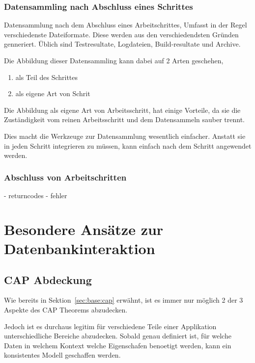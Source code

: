 \subsubsection{Datensammling nach Abschluss eines Schrittes}

Datensammlung nach dem Abschluss eines Arbeitschrittes,
Umfasst in der Regel verschiedenste Dateiformate.
Diese werden aus den verschiedendsten Gr\"unden genneriert.
\"Ublich sind Testresultate, Logdateien, Build-resultate und Archive.

Die Abbildung dieser Datensammling kann dabei auf 2 Arten geschehen,

\begin{enumerate}
    \item als Teil des Schrittes
    \item als eigene Art von Schrit
\end{enumerate}

Die Abbildung als eigene Art von Arbeitsschritt,
hat einige Vorteile, da sie die Zust\"andigkeit vom reinen Arbeitsschritt
und dem Datensammeln sauber trennt.

Dies macht die Werkzeuge zur Datensammlung wesentlich einfacher.
Anstatt sie in jeden Schritt integrieren zu m\"ussen,
kann einfach nach dem Schritt angewendet werden.


\subsubsection{Abschluss von Arbeitschritten}



- returncodes
- fehler

\section{Besondere Ans\"atze zur Datenbankinteraktion}



\subsection{CAP Abdeckung}

Wie bereits in Sektion~\ref{sec:base:cap} erw\"ahnt,
ist es immer nur m\"oglich 2 der 3 Aspekte des CAP Theorems abzudecken.

Jedoch ist es durchaus legitim f\"ur verschiedene Teile einer Applikation unterschiedliche Bereiche abzudecken.
Sobald genau definiert ist, f\"ur welche Daten in welchem Kontext welche Eigenschafen benoetigt werden,
kann ein konsistentes Modell geschaffen werden.

